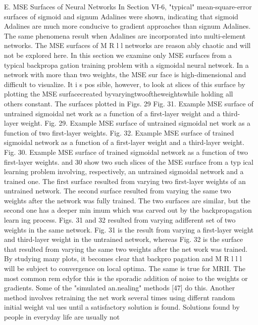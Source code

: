 \documentclass[11pt,a4paper,twocolumn]{article}
\begin{document}
{{E. MSE Surfaces of Neural Networks 
In Section VI-6, "typical" mean-square-error surfaces of 
sigmoid and signum Adalines were shown, indicating that 
sigmoid Adalines are much more conducive to gradient 
approaches than signum Adalines. The same phenomena 
result when Adalines are incorporated into multi-element 
networks. The MSE surfaces of M R l l  networks are reason
ably chaotic and will not be explored here. In this section 
we examine only MSE surfaces from a typical backpropa
gation training problem with a sigmoidal neural network. 
In a network with more than two weights, the MSE sur
face is high-dimensional and difficult to visualize. It i s  pos
sible, however, to look at slices of this surface by plotting 
the MSE surfacecreated byvaryingtwooftheweightswhile 
holding all others constant. The surfaces plotted in Figs. 29 
Fig. 31. Example MSE surface of untrained sigmoidal net
work as a function of a first-layer weight and a third-layer 
weight. 
Fig. 29. Example MSE surface of untrained sigmoidal net
work as a function of two first-layer weights. 
Fig. 32. Example MSE surface of trained sigmoidal network 
as a function of a first-layer weight and a third-layer weight. 
Fig. 30. Example MSE surface of trained sigmoidal network 
as a function of two first-layer weights. 
and 30 show two such slices of the MSE surface from a typ
ical learning problem involving, respectively, an untrained 
sigmoidal network and a trained one. The first surface 
resulted from varying two first-layer weights of an untrained 
network. The second surface resulted from varying the same 
two weights after the network was fully trained. The two 
surfaces are similar, but the second one has a deeper min
imum which was carved out by the backpropagation learn
ing process. Figs. 31 and 32 resulted from varying adifferent 
set of two weights in the same network. Fig. 31 is the result 
from varying a first-layer weight and third-layer weight in 
the untrained network, whereas Fig. 32 is the surface that 
resulted from varying the same two weights after the net
work was trained. 
By studying many plots, it becomes clear that backpro
pagation and M R l l l  will be subject to convergence on local 
optima. The same is true for MRII. The most common rem
edyfor this is the sporadic addition of noise to the weights 
or gradients. Some of the "simulated an.nealing" methods 
[47] do this. Another method involves retraining the net
work several times using differnt random initial weight val
ues until a satisfactory solution is found. 
Solutions found by people in everyday life are usually not 
}}
\end{document}
